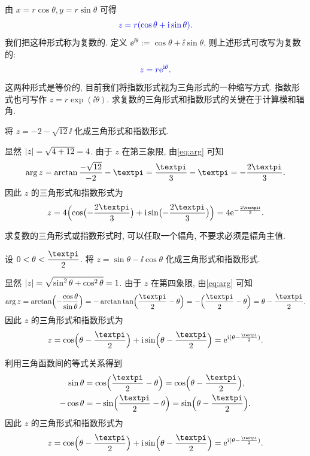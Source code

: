 由 $x=r\cos\theta,y=r\sin\theta$ 可得
\[
  \color{main}z=r(\cos\theta+\ii\sin\theta).
\]
我们把这种形式称为复数的.
定义 \alert{$\ee^{\ii\theta}:=\cos\theta+\ii\sin\theta$}, 则上述形式可改写为复数的:
\[
  \color{main}z=r\ee^{\ii\theta}.
\]
这两种形式是等价的, 目前我们将指数形式视为三角形式的一种缩写方式.
指数形式也可写作 $z=r\exp(\ii\theta)$.
求复数的三角形式和指数形式的\alert{关键在于计算模和辐角}.

\begin{example}
  将 $z=-2-\sqrt{12}\ii$ 化成三角形式和指数形式.
\end{example}

\begin{solution}
  显然 $\lvert z\rvert=\sqrt{4+12}=4$.
  由于 $z$ 在第三象限, 由\eqref{eq:arg} 可知
  \[
     \arg z
    =\arctan\frac{-\sqrt{12}}{-2}-\cpi
    =\frac\cpi3-\cpi
    =-\frac{2\cpi}3.
  \]
  因此 $z$ 的三角形式和指数形式为
  \[
     z
    =4\Bigl(\cos\bigl(-\frac{2\cpi}3\bigr)+\ii\sin\bigl(-\frac{2\cpi}3\bigr)\Bigr)
    =4\ee^{-\frac{2\cpi \ii}3}.
  \]
\end{solution}

求复数的三角形式或指数形式时, 可以任取一个辐角, 不要求必须是辐角主值.

\begin{example}
  设 $0<\theta<\dfrac\cpi2$.
  将 $z=\sin\theta-\ii\cos\theta$ 化成三角形式和指数形式.
\end{example}

\begin{solution}[解法一]
  显然 $\lvert z\rvert=\sqrt{\sin^2\theta+\cos^2\theta}=1$. 由于 $z$ 在第四象限, 由\eqref{eq:arg} 可知
  \[
     \arg z
    =\arctan\Bigl(-\frac{\cos\theta}{\sin\theta}\Bigr)
    =-\arctan\tan\Bigl(\frac\cpi2-\theta\Bigr)
    =-\Bigl(\frac\cpi2-\theta\Bigr)
    =\theta-\frac\cpi2.
  \]
  因此 $z$ 的三角形式和指数形式为
  \[
     z
    =\cos\Bigl(\theta-\frac\cpi2\Bigr)+\ii\sin\Bigl(\theta-\frac\cpi2\Bigr)
    =\ee^{\ii(\theta-\frac\cpi2)}.
  \]
\end{solution}

\begin{solution}[解法二]
  利用三角函数间的等式关系得到
  \begin{align*}
      \sin\theta
    &=\cos\Bigl(\frac\cpi2-\theta\Bigr)
     =\cos\Bigl(\theta-\frac\cpi2\Bigr),\\
      -\cos\theta
    &=-\sin\Bigl(\frac\cpi2-\theta\Bigr)
     =\sin\Bigl(\theta-\frac\cpi2\Bigr).
  \end{align*}
  因此 $z$ 的三角形式和指数形式为
  \[
     z
    =\cos\Bigl(\theta-\frac\cpi2\Bigr)+\ii\sin\Bigl(\theta-\frac\cpi2\Bigr)
    =\ee^{\ii(\theta-\frac\cpi2)}.
  \]
\end{solution}


